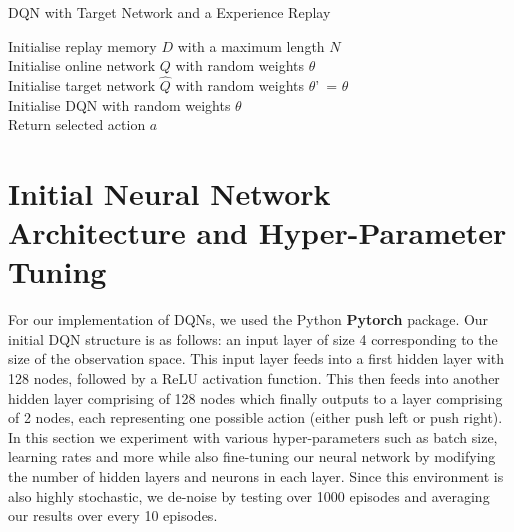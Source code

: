 \documentclass{article}
\begin{document}
\begin{algorithm}[H]
\caption{DQN with Target Network and a Experience Replay}
\SetAlgoLined
\DontPrintSemicolon
{}
Initialise replay memory $D$ with a maximum length $N$\;\\
Initialise online network $Q$ with random weights $\theta$\; \\ 
Initialise target network $\hat{Q}$ with random weights $\theta$'\ = $\theta$\; \\ 
Initialise DQN with random weights $\theta$\; \\ 

Return selected action $a$\;
\end{algorithm}

\section{Initial Neural Network Architecture and Hyper-Parameter Tuning}

For our implementation of DQNs, we used the Python \textbf{Pytorch} package. Our initial DQN structure is as follows: an input layer of size 4 corresponding to the size of the observation space. This input layer feeds into a first hidden layer with 128 nodes, followed by a ReLU activation function. This then feeds into another hidden layer comprising of 128 nodes which finally outputs to a layer comprising of 2 nodes, each representing one possible action (either push left or push right). In this section we experiment with various hyper-parameters such as batch size, learning rates and more while also fine-tuning our neural network by modifying the number of hidden layers and neurons in each layer. Since this environment is also highly stochastic, we de-noise by testing over 1000 episodes and averaging our results over every 10 episodes.
\end{document}
